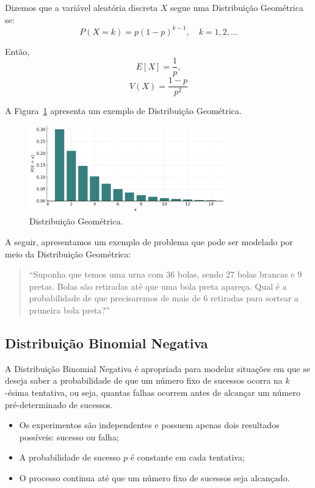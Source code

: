\documentclass{article}
\begin{document}
Dizemos que a variável aleatória discreta $X$ segue uma Distribuição Geométrica se:
    $$
    P(X = k) = p(1 - p)^{k - 1}, \quad k = 1, 2, \ldots
    $$

Então,
    $$
    E[X] = \frac{1}{p},
    $$
    $$
    V(X) = \frac{1 - p}{p^2}
    $$

A Figura~\ref{fig:dist_disc_geometrica} apresenta um exemplo de Distribuição Geométrica.

\begin{figure}[H]
    \centering
    \includegraphics[width=0.75\textwidth]{figuras/dist_disc_geometrica.png}
    \caption{Distribuição Geométrica.}
    \label{fig:dist_disc_geometrica}
\end{figure}

A seguir, apresentamos um exemplo de problema que pode ser modelado por meio da Distribuição Geométrica:
\begin{quote}
``Suponha que temos uma urna com 36 bolas, sendo 27 bolas brancas e 9 pretas. Bolas são retiradas até que uma bola preta apareça. Qual é a probabilidade de que precisaremos de mais de 6 retiradas para sortear a primeira bola preta?''
\end{quote}

\subsection{Distribuição Binomial Negativa}
A Distribuição Binomial Negativa é apropriada para modelar situações em que se deseja saber a probabilidade de que um número fixo de sucessos ocorra na $k$-ésima tentativa, ou seja, quantas falhas ocorrem antes de alcançar um número pré-determinado de sucessos.
\begin{itemize}
    \item Os experimentos são independentes e possuem apenas dois resultados possíveis: sucesso ou falha;
    \item A probabilidade de sucesso $p$ é constante em cada tentativa;
    \item O processo continua até que um número fixo de sucessos seja alcançado.
\end{itemize}
\end{document}
